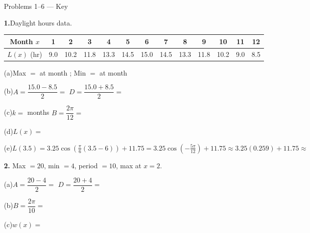 \documentclass[10pt]{article}
\begin{document}
\namedateperiod

\vspace{0.10in}

\begin{notesbox}{Problems 1--6 --- Key}

\textbf{1.}\quad Daylight hours data.

\vspace{4pt}
\begin{center}
\renewcommand{\arraystretch}{1.35}
\small
\begin{tabular}{|c|c|c|c|c|c|c|c|c|c|c|c|c|}
\hline
Month $x$ & 1 & 2 & 3 & 4 & 5 & 6 & 7 & 8 & 9 & 10 & 11 & 12 \\
\hline
$L(x)$ (hr) & 9.0 & 10.2 & 11.8 & 13.3 & 14.5 & 15.0 & 14.5 & 13.3 & 11.8 & 10.2 & 9.0 & 8.5 \\
\hline
\end{tabular}
\end{center}

\vspace{4pt}
(a)\quad Max $= $  at month ;
\quad Min $= $  at month 

\vspace{4pt}
(b)\quad $A = \dfrac{15.0 - 8.5}{2} = $ 
\quad $D = \dfrac{15.0 + 8.5}{2} = $ 

\vspace{4pt}
(c)\quad $k = $  months \qquad $B = \dfrac{2\pi}{12} = $ 

\vspace{4pt}
(d)\quad $L(x) = $ 

\vspace{4pt}
(e)\quad $L(3.5) = 3.25\cos\!\left(\tfrac{\pi}{6}(3.5-6)\right)+11.75 = 3.25\cos\!\left(-\tfrac{5\pi}{12}\right)+11.75 \approx 3.25(0.259)+11.75 \approx $ 

\vspace{0.12in}
\textbf{2.} Max $= 20$, min $= 4$, period $= 10$, max at $x = 2$.

\vspace{4pt}
(a)\quad $A = \dfrac{20-4}{2} = $  \quad $D = \dfrac{20+4}{2} = $ 

\vspace{4pt}
(b)\quad $B = \dfrac{2\pi}{10} = $ 

\vspace{4pt}
(c)\quad $w(x) = $ 


\end{notesbox}
\end{document}
